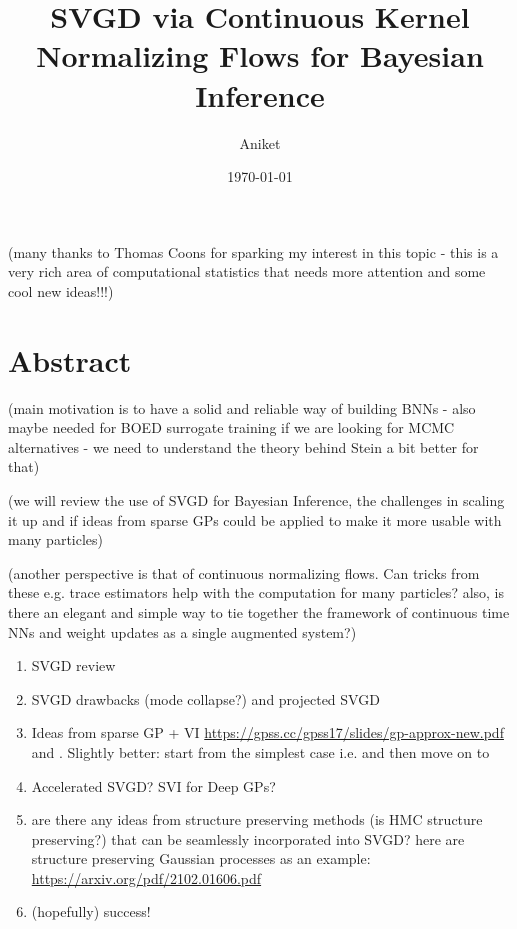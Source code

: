\documentclass[12pt]{article}
\title{SVGD via Continuous Kernel Normalizing Flows for Bayesian Inference}
\author{Aniket}
\date{\today}
\renewcommand{\[}{\left[}
\renewcommand{\]}{\right]}
\renewcommand{\(}{\left(}
\renewcommand{\)}{\right)}
\begin{document}
\maketitle

(many thanks to Thomas Coons for sparking my interest in this topic - this is a very rich area of computational statistics that needs more attention and some cool new ideas!!!)

\section{Abstract}

(main motivation is to have a solid and reliable way of building BNNs - also maybe needed for BOED surrogate training if we are looking for MCMC alternatives -  we need to understand the theory behind Stein a bit better for that)

(we will review the use of SVGD for Bayesian Inference, the challenges in scaling it up and if ideas from sparse GPs could be applied to make it more usable with many particles)

(another perspective is that of continuous normalizing flows. Can tricks from these e.g. trace estimators help with the computation for many particles? also, is there an elegant and simple way to tie together the framework of continuous time NNs and weight updates as a single augmented system?)

\begin{enumerate}
    \item SVGD review \cite{liu_short_2016,liu_kernelized_2016,liu_stein_2019}

    \item SVGD drawbacks (mode collapse?) and projected SVGD \cite{chen_projected_2020}

    \item Ideas from sparse GP + VI \url{https://gpss.cc/gpss17/slides/gp-approx-new.pdf} and \cite{noack_unifying_2023}. Slightly better: start from the simplest case i.e. \cite{snelson_sparse_2005} and then move on to \cite{titsias_variational_2009,titsias_bayesian_2010}

    \item Accelerated SVGD? SVI for Deep GPs? \cite{hoffman_stochastic_2013}

    \item are there any ideas from structure preserving methods (is HMC structure preserving?) that can be seamlessly incorporated into SVGD? here are structure preserving Gaussian processes as an example: \url{https://arxiv.org/pdf/2102.01606.pdf}
    
    \item (hopefully) success!
\end{enumerate}
\end{document}
